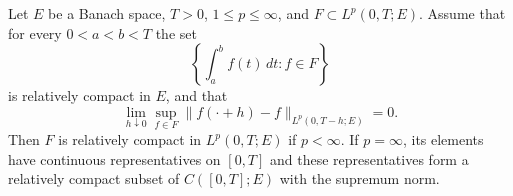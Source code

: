Let $E$ be a Banach space, $T>0$, $1\le p\le\infty$, and $F\subset L^p(0,T;E)$.
Assume that for every $0<a<b<T$ the set
\[
\left\{\int_a^b f(t)\,dt:f\in F\right\}
\]
is relatively compact in $E$, and that
\[
\lim_{h\downarrow0}\sup_{f\in F}\|f(\cdot+h)-f\|_{L^p(0,T-h;E)}=0.
\]
Then $F$ is relatively compact in $L^p(0,T;E)$ if $p<\infty$.
If $p=\infty$, its elements have continuous representatives on $[0,T]$ and these representatives form a relatively compact subset of $C([0,T];E)$ with the supremum norm.